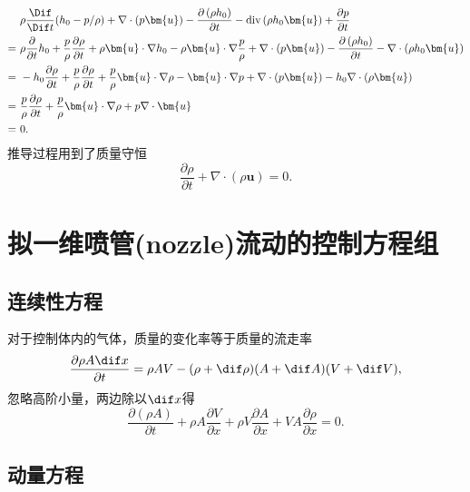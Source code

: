 \documentclass[12pt]{article}
\begin{document}
\begin{align}
	& \rho \frac{\Dif }{\Dif t}(h_0-p/\rho) + \nabla \cdot (p\bm{u}) - \frac{\partial\left(\rho h_{0}\right)}{\partial t} - \operatorname{div}\left(\rho h_{0} \bm{u}\right) + \frac{\partial p}{\partial t}\\
	= \ & \rho \frac{\partial}{\partial t}h_0 + \frac{p}{\rho} \frac{\partial \rho}{\partial t} + \rho \bm{u} \cdot \nabla h_0 - \rho \bm{u} \cdot \nabla \frac{p}{\rho}+ \nabla \cdot (p\bm{u}) - \frac{\partial\left(\rho h_{0}\right)}{\partial t} - \nabla \cdot \left(\rho h_{0} \bm{u}\right) \\
	= \ & -h_0 \frac{\partial \rho}{\partial t} + \frac{p}{\rho} \frac{\partial \rho}{\partial t}  + \frac{p}{\rho} \bm{u} \cdot \nabla \rho - \bm{u} \cdot \nabla p+ \nabla \cdot (p\bm{u}) - h_0 \nabla \cdot \left(\rho \bm{u}\right) \\
	= \ & \frac{p}{\rho} \frac{\partial \rho}{\partial t}  + \frac{p}{\rho} \bm{u} \cdot \nabla \rho + p \nabla \cdot \bm{u} \\
	= \ & 0.
\end{align}
推导过程用到了质量守恒
\begin{equation}
	\frac{\partial \rho}{\partial t} + \nabla \cdot (\rho \bm{u})=0.
\end{equation}

\section{拟一维喷管(nozzle)流动的控制方程组}

\subsection{连续性方程}

对于控制体内的气体，质量的变化率等于质量的流走率
\begin{equation}
	\frac{\partial \rho A \dif x}{\partial t} = \rho A V - (\rho + \dif \rho)(A+\dif A)(V+\dif V),
\end{equation}
忽略高阶小量，两边除以$\dif x$得
\begin{equation}
	\frac{\partial(\rho A)}{\partial t}+\rho A \frac{\partial V}{\partial x}+\rho V \frac{\partial A}{\partial x}+V A \frac{\partial \rho}{\partial x}=0.
	\label{eq:3}
\end{equation}

\subsection{动量方程}
\end{document}

